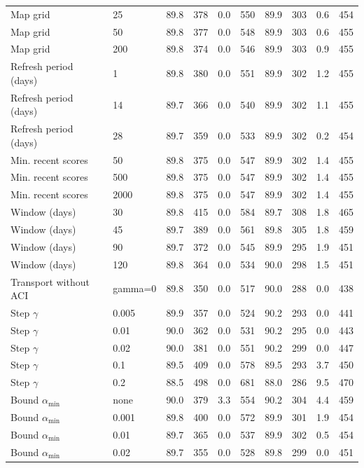 \begin{table}[tp]
\begin{tabular}{ll rrrr rrrr}
Map grid & 25 & 89.8 & 378 & 0.0 & 550 & 89.9 & 303 & 0.6 & 454 \\
Map grid & 50 & 89.8 & 377 & 0.0 & 548 & 89.9 & 303 & 0.6 & 455 \\
Map grid & 200 & 89.8 & 374 & 0.0 & 546 & 89.9 & 303 & 0.9 & 455 \\
Refresh period (days) & 1 & 89.8 & 380 & 0.0 & 551 & 89.9 & 302 & 1.2 & 455 \\
Refresh period (days) & 14 & 89.7 & 366 & 0.0 & 540 & 89.9 & 302 & 1.1 & 455 \\
Refresh period (days) & 28 & 89.7 & 359 & 0.0 & 533 & 89.9 & 302 & 0.2 & 454 \\
Min. recent scores & 50 & 89.8 & 375 & 0.0 & 547 & 89.9 & 302 & 1.4 & 455 \\
Min. recent scores & 500 & 89.8 & 375 & 0.0 & 547 & 89.9 & 302 & 1.4 & 455 \\
Min. recent scores & 2000 & 89.8 & 375 & 0.0 & 547 & 89.9 & 302 & 1.4 & 455 \\
Window (days) & 30 & 89.8 & 415 & 0.0 & 584 & 89.7 & 308 & 1.8 & 465 \\
Window (days) & 45 & 89.7 & 389 & 0.0 & 561 & 89.8 & 305 & 1.8 & 459 \\
Window (days) & 90 & 89.7 & 372 & 0.0 & 545 & 89.9 & 295 & 1.9 & 451 \\
Window (days) & 120 & 89.8 & 364 & 0.0 & 534 & 90.0 & 298 & 1.5 & 451 \\
Transport without ACI & gamma=0 & 89.8 & 350 & 0.0 & 517 & 90.0 & 288 & 0.0 & 438 \\
Step $\gamma$ & 0.005 & 89.9 & 357 & 0.0 & 524 & 90.2 & 293 & 0.0 & 441 \\
Step $\gamma$ & 0.01 & 90.0 & 362 & 0.0 & 531 & 90.2 & 295 & 0.0 & 443 \\
Step $\gamma$ & 0.02 & 90.0 & 381 & 0.0 & 551 & 90.2 & 299 & 0.0 & 447 \\
Step $\gamma$ & 0.1 & 89.5 & 409 & 0.0 & 578 & 89.5 & 293 & 3.7 & 450 \\
Step $\gamma$ & 0.2 & 88.5 & 498 & 0.0 & 681 & 88.0 & 286 & 9.5 & 470 \\
Bound $\alpha_{\min}$ & none & 90.0 & 379 & 3.3 & 554 & 90.2 & 304 & 4.4 & 459 \\
Bound $\alpha_{\min}$ & 0.001 & 89.8 & 400 & 0.0 & 572 & 89.9 & 301 & 1.9 & 454 \\
Bound $\alpha_{\min}$ & 0.01 & 89.7 & 365 & 0.0 & 537 & 89.9 & 302 & 0.5 & 454 \\
Bound $\alpha_{\min}$ & 0.02 & 89.7 & 355 & 0.0 & 528 & 89.8 & 299 & 0.0 & 451 \\

\end{tabular}
\end{table}
